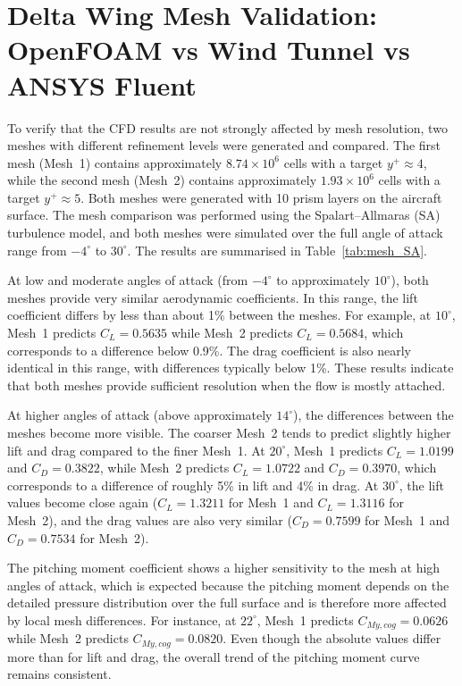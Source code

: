 \section{Delta Wing Mesh Validation: OpenFOAM vs Wind Tunnel vs ANSYS Fluent}


To verify that the CFD results are not strongly affected by mesh resolution, two meshes with different refinement levels were generated and compared. The first mesh (Mesh~1) contains approximately $8.74\times 10^{6}$ cells with a target $y^{+}\approx 4$, while the second mesh (Mesh~2) contains approximately $1.93\times 10^{6}$ cells with a target $y^{+}\approx 5$. Both meshes were generated with 10 prism layers on the aircraft surface. The mesh comparison was performed using the Spalart--Allmaras (SA) turbulence model, and both meshes were simulated over the full angle of attack range from $-4^{\circ}$ to $30^{\circ}$. The results are summarised in Table~\ref{tab:mesh_SA}.

At low and moderate angles of attack (from $-4^{\circ}$ to approximately $10^{\circ}$), both meshes provide very similar aerodynamic coefficients. In this range, the lift coefficient differs by less than about 1\% between the meshes. For example, at $10^{\circ}$, Mesh~1 predicts $C_{L}=0.5635$ while Mesh~2 predicts $C_{L}=0.5684$, which corresponds to a difference below 0.9\%. The drag coefficient is also nearly identical in this range, with differences typically below 1\%. These results indicate that both meshes provide sufficient resolution when the flow is mostly attached.

At higher angles of attack (above approximately $14^{\circ}$), the differences between the meshes become more visible. The coarser Mesh~2 tends to predict slightly higher lift and drag compared to the finer Mesh~1. At $20^{\circ}$, Mesh~1 predicts $C_{L}=1.0199$ and $C_{D}=0.3822$, while Mesh~2 predicts $C_{L}=1.0722$ and $C_{D}=0.3970$, which corresponds to a difference of roughly 5\% in lift and 4\% in drag. At $30^{\circ}$, the lift values become close again ($C_{L}=1.3211$ for Mesh~1 and $C_{L}=1.3116$ for Mesh~2), and the drag values are also very similar ($C_{D}=0.7599$ for Mesh~1 and $C_{D}=0.7534$ for Mesh~2).

The pitching moment coefficient shows a higher sensitivity to the mesh at high angles of attack, which is expected because the pitching moment depends on the detailed pressure distribution over the full surface and is therefore more affected by local mesh differences. For instance, at $22^{\circ}$, Mesh~1 predicts $C_{My,cog}=0.0626$ while Mesh~2 predicts $C_{My,cog}=0.0820$. Even though the absolute values differ more than for lift and drag, the overall trend of the pitching moment curve remains consistent.

